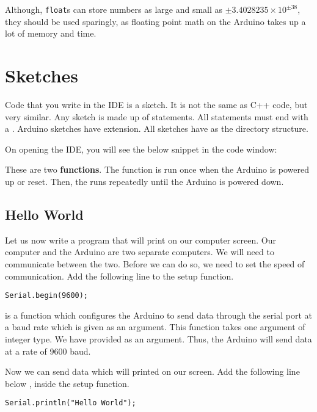 \documentclass{article}
\begin{document}
		Although, \texttt{float}s can store numbers as large and small as $\pm3.4028235\times10^{\pm38}$, they should be used sparingly, as floating point math on the Arduino takes up a lot of memory and time.


\section{Sketches}

	Code that you write in the IDE is a sketch. It is not the same as C++ code, but very similar. Any sketch is made up of statements. All statements must end with a \inlncd{;}. Arduino sketches have  extension. All sketches have  as the directory structure.

		On opening the IDE, you will see the below snippet in the code window:

		

		These are two \textbf{functions}. The  function is run once when the Arduino is powered up or reset. Then, the  runs repeatedly until the Arduino is powered down.

		\subsection{Hello World}
			Let us now write a program that will print  on our computer screen. Our computer and the Arduino are two separate computers. We will need to communicate between the two. Before we can do so, we need to set the speed of communication. Add the following line to the setup function.

			\begin{lstlisting}[firstnumber = 3]
			Serial.begin(9600);
			\end{lstlisting}

			 is a function which configures the Arduino to send data through the serial port at a baud rate which is given as an argument. This function takes one argument of integer type. We have provided  as an argument. Thus, the Arduino will send data at a rate of 9600 baud.

			Now we can send data which will printed on our screen. Add the following line below , inside the setup function.

			\begin{lstlisting}[firstnumber = 4]
			Serial.println("Hello World");
			\end{lstlisting}
\end{document}
